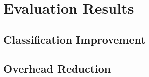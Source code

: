 \documentclass[../../main.tex]{subfiles}
\begin{document}
\section{Evaluation Results}

\subsection{Classification Improvement}

\subsection{Overhead Reduction}
\end{document}
